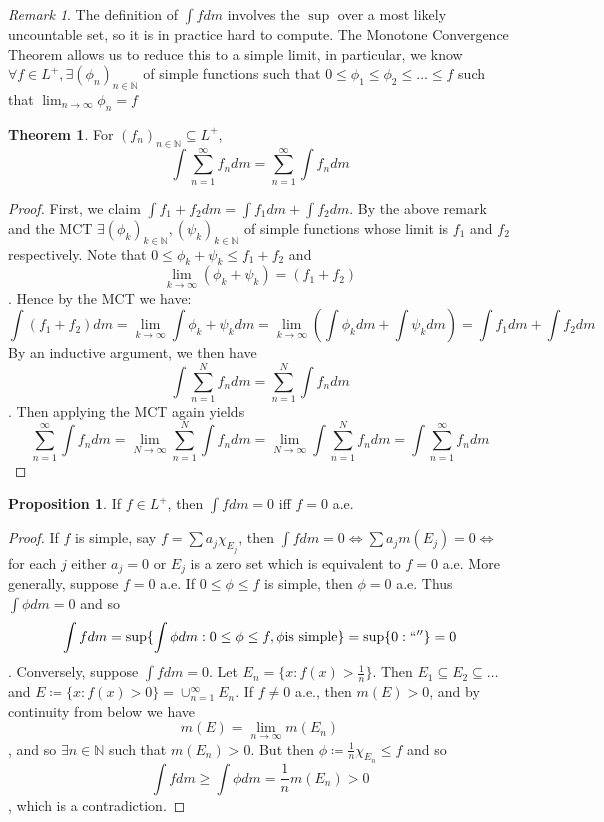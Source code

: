 \documentclass{article}
\theoremstyle{definition}
\newtheorem{prop}{Proposition}[section]
\newtheorem{theorem}{Theorem}[section]
\theoremstyle{remark}
\newtheorem*{remark}{Remark}
\theoremstyle{remark}
\def\naturals{{\mathbb N}}
\begin{document}
\begin{remark}
The definition of $\int f dm$ involves the $\sup$ over a most likely uncountable set, so it is in practice hard to compute. The Monotone Convergence Theorem allows us to reduce this to a simple limit, in particular, we know $\forall f \in L^{+}, \exists (\phi_n)_{n\in\naturals}$ of simple functions such that $0 \leq \phi_1 \leq \phi_2 \leq \dots \leq f$ such that $\lim_{n\to\infty} \phi_n = f$
\end{remark}
\begin{theorem}
For $(f_n)_{n\in\naturals} \subseteq L^{+}$, 
$$\int \sum_{n=1}^\infty f_n dm = \sum_{n=1}^{\infty} \int f_n dm$$
\end{theorem}
\begin{proof}
First, we claim $\int f_1 + f_2 dm = \int f_1 dm + \int f_2 dm$. By the above remark and the MCT $\exists (\phi_k)_{k\in\naturals}, (\psi_k)_{k\in\naturals}$ of simple functions whose limit is $f_1$ and $f_2$ respectively. Note that $0 \leq \phi_k + \psi_k \leq f_1 + f_2$ and
$$\lim_{k\to\infty} (\phi_k + \psi_k) = (f_1 + f_2)$$.
Hence by the MCT we have:
$$\int(f_1 + f_2)dm = \lim_{k\to\infty} \int \phi_k + \psi_k dm = \lim_{k\to\infty}(\int \phi_k dm + \int \psi_k dm) = \int f_1dm + \int f_2 dm$$
By an inductive argument, we then have 
$$\int \sum_{n=1}^N f_n dm = \sum_{n=1}^N \int f_n dm$$. 
Then applying the MCT again yields
$$ \sum_{n=1}^\infty \int f_n dm = \lim_{N\to\infty} \sum_{n=1}^N \int f_n dm = \lim_{N\to\infty} \int \sum_{n=1}^N f_n dm = \int \sum_{n=1}^\infty f_n dm$$
\end{proof}
\begin{prop}
If $f \in L^{+}$, then $\int f dm = 0$ iff $f = 0$ a.e.
\end{prop}
\begin{proof}
If $f$ is simple, say $f = \sum a_j \chi_{E_j}$, then $\int f dm = 0 \Leftrightarrow \sum a_j m(E_j) = 0 \Leftrightarrow $ for each $j$ either $a_j = 0$ or $E_j$ is a zero set which is equivalent to $f = 0$ a.e. More generally, suppose $f=0$ a.e. If $0 \leq \phi \leq f$ is simple, then $\phi = 0$ a.e. Thus $\int \phi dm = 0$ and so
$$\int f dm = \sup\{\int \phi dm : 0 \leq \phi \leq f, \phi \text{is simple}\} = \sup \{0: ``''\} = 0$$. 
Conversely, suppose $\int fdm = 0$. Let $E_n = \{x : f(x) > \frac{1}{n}\}$. Then $E_1 \subseteq E_2 \subseteq \dots$ and $E \coloneqq \{x : f(x) > 0\} = \cup_{n=1}^\infty E_n$. If $f \neq 0$ a.e., then $m(E) > 0$, and by continuity from below we have
$$m(E) = \lim_{n\to\infty} m(E_n)$$, and so $\exists n\in\naturals$ such that $m(E_n) > 0$. But then $\phi \coloneqq \frac{1}{n} \chi_{E_n} \leq f$ and so
$$\int f dm \geq \int \phi dm = \frac{1}{n} m(E_n) > 0$$, which is a contradiction. 
\end{proof}
\end{document}

